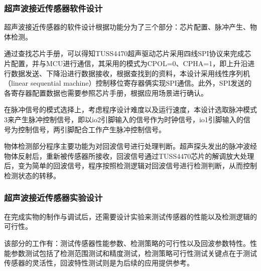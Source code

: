 \subsubsection{超声波接近传感器软件设计}
超声波接近传感器的软件设计根据功能分为了三个部分：芯片配置、脉冲产生、物体检测。\par
通过查找芯片手册，可以得知TUSS4470超声驱动芯片采用四线SPI协议来完成芯片配置，并与MCU进行通信，其采用的模式为CPOL=0、CPHA=1，即上升沿进行数据发送、下降沿进行数据接收，根据查找到的资料，本设计采用线性序列机（linear sequential machine）控制移位寄存器俩实现SPI通信。此外，SPI发送的各寄存器配置数据也需要参照芯片手册，根据应用场景进行确认。\par
在脉冲信号的模式选择上，考虑程序设计难度以及运行速度，本设计选取脉冲模式3来产生脉冲控制信号，即以io2引脚输入的信号作为时钟信号，io1引脚输入的信号为控制信号，两引脚配合工作产生脉冲控制信号。\par
物体检测部分程序主要功能为对回波信号进行处理判断。超声探头发出的脉冲波经物体反射后，重新被传感器所接收，回波信号通过TUSS4470芯片的解调放大处理后，变为简单的回波信号，程序按照检测逻辑对回波信号进行检测判断，从而控制检测状态的转移。
\subsubsection{超声波接近传感器实验设计}
在完成实物的制作与调试后，还需要设计实验来测试传感器的性能以及检测逻辑的可行性。\par
该部分的工作有：测试传感器性能参数、检测策略的可行性以及回波参数特性。性能参数测试包括了检测范围测试和精度测试，检测策略可行性测试关键点在于测试传感器的灵活性，回波特性测试则是为后续的应用提供参考。


